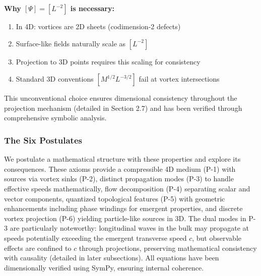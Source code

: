 \textbf{Why $[\Psi] = [L^{-2}]$ is necessary:}
\begin{enumerate}
\item In 4D: vortices are 2D sheets (codimension-2 defects)
\item Surface-like fields naturally scale as $[L^{-2}]$
\item Projection to 3D points requires this scaling for consistency
\item Standard 3D conventions $[M^{1/2} L^{-3/2}]$ fail at vortex intersections
\end{enumerate}

This unconventional choice ensures dimensional consistency throughout the projection mechanism (detailed in Section 2.7) and has been verified through comprehensive symbolic analysis.

\subsubsection{The Six Postulates}

We postulate a mathematical structure with these properties and explore its consequences. These axioms provide a compressible 4D medium (P-1) with sources via vortex sinks (P-2), distinct propagation modes (P-3) to handle effective speeds mathematically, flow decomposition (P-4) separating scalar and vector components, quantized topological features (P-5) with geometric enhancements including phase windings for emergent properties, and discrete vortex projection (P-6) yielding particle-like sources in 3D. The dual modes in P-3 are particularly noteworthy: longitudinal waves in the bulk may propagate at speeds potentially exceeding the emergent transverse speed $c$, but observable effects are confined to $c$ through projections, preserving mathematical consistency with causality (detailed in later subsections). All equations have been dimensionally verified using SymPy, ensuring internal coherence.

